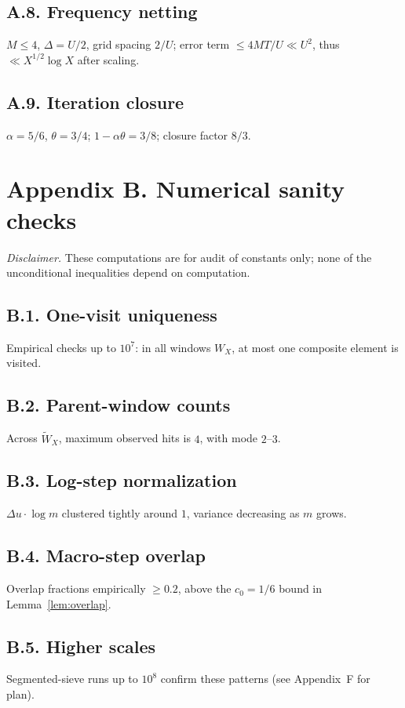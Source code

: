 \documentclass[11pt]{article}
\theoremstyle{plain}
\theoremstyle{definition}
\theoremstyle{remark}
\begin{document}
\subsection*{A.8. Frequency netting}
$M\le 4$, $\Delta=U/2$, grid spacing $2/U$; error term $\le 4MT/U\ll U^2$, thus $\ll X^{1/2}\log X$ after scaling.

\subsection*{A.9. Iteration closure}
$\alpha=5/6$, $\theta=3/4$; $1-\alpha\theta=3/8$; closure factor $8/3$.


\section*{Appendix B. Numerical sanity checks}\label{app:numerics}
\noindent\emph{Disclaimer.} These computations are for audit of constants only; none of the unconditional inequalities depend on computation.

\subsection*{B.1. One-visit uniqueness}
Empirical checks up to $10^7$: in all windows $W_X$, at most one composite element is visited.

\subsection*{B.2. Parent-window counts}
Across $\widetilde W_X$, maximum observed hits is $4$, with mode $2$--$3$.

\subsection*{B.3. Log-step normalization}
$\Delta u\cdot \log m$ clustered tightly around $1$, variance decreasing as $m$ grows.

\subsection*{B.4. Macro-step overlap}
Overlap fractions empirically $\ge 0.2$, above the $c_0=1/6$ bound in Lemma~\ref{lem:overlap}.

\subsection*{B.5. Higher scales}
Segmented-sieve runs up to $10^8$ confirm these patterns (see Appendix~F for plan).
\end{document}
